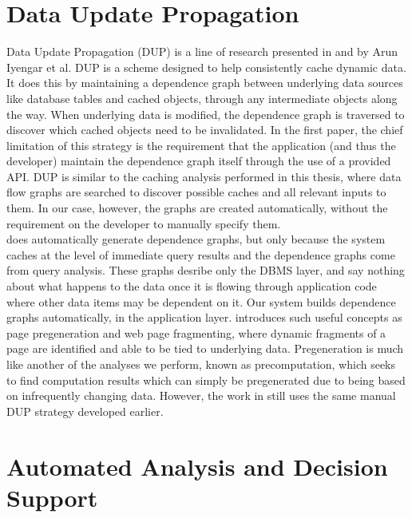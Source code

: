 \documentclass[msc,oneside]{ubcthesis}
\begin{document}
\section{Data Update Propagation}

	Data Update Propagation (DUP) is a line of research presented in \cite{Challenger1999} \cite{Degenaro2000} \cite{Challenger2001} \cite{Challenger2004} and \cite{Challenger2005} by Arun Iyengar et al. DUP is a scheme designed to help consistently cache dynamic data. It does this by maintaining a dependence graph between underlying data sources like database tables and cached objects, through any intermediate objects along the way. When underlying data is modified, the dependence graph is traversed to discover which cached objects need to be invalidated. In the first paper, the chief limitation of this strategy is the requirement that the application (and thus the developer) maintain the dependence graph itself through the use of a provided API. DUP is similar to the caching analysis performed in this thesis, where data flow graphs are searched to discover possible caches and all relevant inputs to them. In our case, however, the graphs are created automatically, without the requirement on the developer to manually specify them. \\

	\cite{Degenaro2000} does automatically generate dependence graphs, but only because the system caches at the level of immediate query results and the dependence graphs come from query analysis. These graphs desribe only the DBMS layer, and say nothing about what happens to the data once it is flowing through application code where other data items may be dependent on it. Our system builds dependence graphs automatically, in the application layer. \cite{Challenger2001} introduces such useful concepts as page pregeneration and web page fragmenting, where dynamic fragments of a page are identified and able to be tied to underlying data. Pregeneration is much like another of the analyses we perform, known as precomputation, which seeks to find computation results which can simply be pregenerated due to being based on infrequently changing data. However, the work in \cite{Challenger2001} still uses the same manual DUP strategy developed earlier.

\section{Automated Analysis and Decision Support}
	
\end{document}
